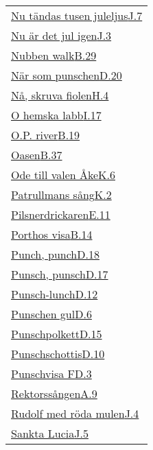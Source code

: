 \begin{longtable}[h]{@{}p{\linewidth}@{}}
  \hyperref[nutandas]{Nu tändas tusen juleljus}\dotfill\hyperref[nutandas]{J.7}\\
  \hyperref[nuardetjuligen]{Nu är det jul igen}\dotfill\hyperref[nuardetjuligen]{J.3}\\
  \hyperref[nubbenwalk]{Nubben walk}\dotfill\hyperref[nubbenwalk]{B.29}\\
  \hyperref[narsompunschen]{När som punschen}\dotfill\hyperref[narsompunschen]{D.20}\\
  \hyperref[naskruvafiolen]{Nå, skruva fiolen}\dotfill\hyperref[naskruvafiolen]{H.4}\\
  \hyperref[ohemskalabb]{O hemska labb}\dotfill\hyperref[ohemskalabb]{I.17}\\
  \hyperref[opriver]{O.P. river}\dotfill\hyperref[opriver]{B.19}\\
  \hyperref[oasen]{Oasen}\dotfill\hyperref[oasen]{B.37}\\
  \hyperref[valenake]{Ode till valen Åke}\dotfill\hyperref[valenake]{K.6}\\
  \hyperref[patrullmanssang]{Patrullmans sång}\dotfill\hyperref[patrullmanssang]{K.2}\\
  \hyperref[pilsnerdrickaren]{Pilsnerdrickaren}\dotfill\hyperref[pilsnerdrickaren]{E.11}\\
  \hyperref[porthos]{Porthos visa}\dotfill\hyperref[porthos]{B.14}\\
  \hyperref[punchpunch]{Punch, punch}\dotfill\hyperref[punchpunch]{D.18}\\
  \hyperref[punschpunsch]{Punsch, punsch}\dotfill\hyperref[punschpunsch]{D.17}\\
  \hyperref[punschlunch]{Punsch-lunch}\dotfill\hyperref[punschlunch]{D.12}\\
  \hyperref[punschengul]{Punschen gul}\dotfill\hyperref[punschengul]{D.6}\\
  \hyperref[punschpolkett]{Punschpolkett}\dotfill\hyperref[punschpolkett]{D.15}\\
  \hyperref[punschschottis]{Punschschottis}\dotfill\hyperref[punschschottis]{D.10}\\
  \hyperref[punschvisaf]{Punschvisa F}\dotfill\hyperref[punschvisaf]{D.3}\\
  \hyperref[rektorssangen]{Rektorssången}\dotfill\hyperref[rektorssangen]{A.9}\\
  \hyperref[rudolfmedrodamulen]{Rudolf med röda mulen}\dotfill\hyperref[rudolfmedrodamulen]{J.4}\\
  \hyperref[sanktalucia]{Sankta Lucia}\dotfill\hyperref[sanktalucia]{J.5}\\

\end{longtable}
